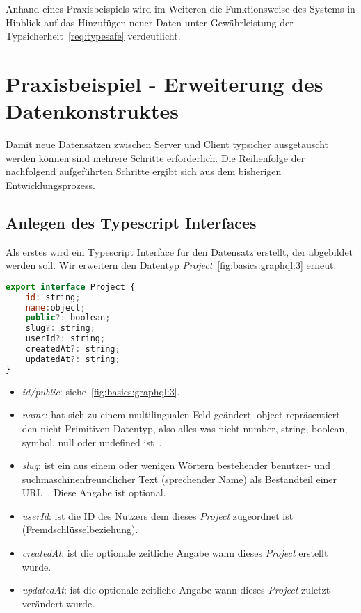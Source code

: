 Anhand eines Praxisbeispiels wird im Weiteren die Funktionsweise des Systems in Hinblick auf das Hinzufügen neuer Daten
unter Gewährleistung der Typsicherheit~\ref{req:typesafe} verdeutlicht.

\section{Praxisbeispiel - Erweiterung des Datenkonstruktes}
\label{sec:requirements:example}

Damit neue Datensätzen zwischen Server und Client typsicher ausgetauscht werden können sind mehrere Schritte erforderlich.
Die Reihenfolge der nachfolgend aufgeführten Schritte ergibt sich aus dem bisherigen Entwicklungsprozess.

\subsection{Anlegen des Typescript Interfaces}
\label{sec:requirements:example:interface}

Als erstes wird ein Typescript Interface für den Datensatz erstellt, der abgebildet werden soll.
Wir erweitern den Datentyp \emph{Project}~\ref{fig:basics:graphql:3} erneut:

\begin{lstlisting}[language=JavaScript,float=h!,caption={Typescript Interface für die Darstellung eines Projektes}, label={lst:example:projectdesc}]
export interface Project {
    id: string;
    name:object;
    public?: boolean;
    slug?: string;
    userId?: string;
    createdAt?: string;
    updatedAt?: string;
}
\end{lstlisting}

\begin{itemize}
    \setlength\itemsep{-1em}
    \item \emph{id/public}: siehe~\ref{fig:basics:graphql:3}.
    \item \emph{name}: hat sich zu einem multilingualen Feld geändert. object repräsentiert den nicht Primitiven Datentyp, also alles was nicht number, string, boolean, symbol, null oder undefined ist~\cite{typescript-object}.
    \item \emph{slug}: ist ein aus einem oder wenigen Wörtern bestehender benutzer- und suchmaschinenfreundlicher
    Text (sprechender Name) als Bestandteil einer URL~\cite{slug-wikipedia}. Diese Angabe ist optional.
    \item \emph{userId}: ist die ID des Nutzers dem dieses \emph{Project} zugeordnet ist (Fremdschlüsselbeziehung).
    \item \emph{createdAt}: ist die optionale zeitliche Angabe wann dieses \emph{Project} erstellt wurde.
    \item \emph{updatedAt}: ist die optionale zeitliche Angabe wann dieses \emph{Project} zuletzt verändert wurde.
\end{itemize}

